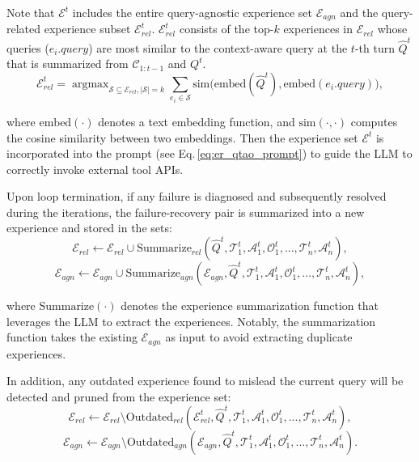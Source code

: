 \documentclass[runningheads]{llncs}
\begin{document}
Note that $\mathcal{E}^{t}$ includes the entire query-agnostic experience set $\mathcal{E}_{agn}$ and the query-related experience subset $\mathcal{E}_{rel}^{t}$.
$\mathcal{E}_{rel}^{t}$ consists of the top-$k$ experiences in $\mathcal{E}_{rel}$ whose queries ($e_i.query$) are most similar to the context-aware query at the $t$-th turn $\hat{Q}^t$ that is summarized from $\mathcal{C}_{1:t-1}$ and $Q^t$.
\begin{equation}
    \mathcal{E}_{rel}^{t} = \mathop{\arg\max}_{\mathcal{S} \subseteq \mathcal{E}_{rel}, |\mathcal{S}|=k} \sum_{e_i \in \mathcal{S}} \text{sim}\big(\text{embed}(\hat{Q}^t), \text{embed}(e_i.{query})\big),
    \label{eq:esr_retrieve}
\end{equation}

\noindent where $\text{embed}(\cdot)$ denotes a text embedding function, and $\text{sim}(\cdot,\cdot)$ computes the cosine similarity between two embeddings. 
Then the experience set $\mathcal{E}^{t}$ is incorporated into the prompt (see Eq.\,\eqref{eq:er_qtao_prompt}) to guide the LLM to correctly invoke external tool APIs.


Upon loop termination, if any failure is diagnosed and subsequently resolved during the iterations, the failure-recovery pair is summarized into a new experience and stored in the sets:
\begin{equation}
    \mathcal{E}_{rel} \leftarrow \mathcal{E}_{rel} \cup \text{Summarize}_{rel}(\hat{Q}^t, \mathcal{T}_1^t, \mathcal{A}_1^t, \mathcal{O}_1^t,..., \mathcal{T}_{n}^t, \mathcal{A}_{n}^t),
    \label{eq:esr_rel_store}
\end{equation}
\begin{equation}
    \mathcal{E}_{agn} \leftarrow \mathcal{E}_{agn} \cup \text{Summarize}_{agn}(\mathcal{E}_{agn}, \hat{Q}^t, \mathcal{T}_1^t, \mathcal{A}_1^t, \mathcal{O}_1^t,..., \mathcal{T}_{n}^t, \mathcal{A}_{n}^t),
    \label{eq:esr_agn_store}
\end{equation}

\noindent where $\text{Summarize}(\cdot)$ denotes the experience summarization function that leverages the LLM to extract the experiences. 
Notably, the summarization function takes the existing $\mathcal{E}_{agn}$ as input to avoid extracting duplicate experiences.


In addition, any outdated experience found to mislead the current query will be detected and pruned from the experience set:
\begin{equation}
    \mathcal{E}_{rel} \leftarrow \mathcal{E}_{rel} \setminus \text{Outdated}_{rel}(\mathcal{E}_{rel}^t, \hat{Q}^t, \mathcal{T}_1^t, \mathcal{A}_1^t, \mathcal{O}_1^t,..., \mathcal{T}_{n}^t, \mathcal{A}_{n}^t),
    \label{eq:esr_rel_outdate}
\end{equation}
\begin{equation}
    \mathcal{E}_{agn} \leftarrow \mathcal{E}_{agn} \setminus \text{Outdated}_{agn}(\mathcal{E}_{agn}, \hat{Q}^t, \mathcal{T}_1^t, \mathcal{A}_1^t, \mathcal{O}_1^t,..., \mathcal{T}_{n}^t, \mathcal{A}_{n}^t).
    \label{eq:esr_agn_outdate}
\end{equation}
\end{document}
